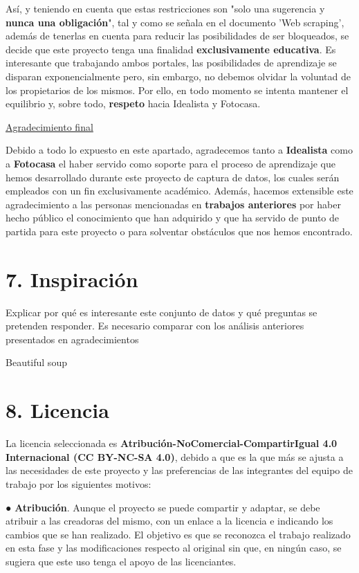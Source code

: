 \documentclass[12pt]{article}
\begin{document}
Así, y teniendo en cuenta que estas restricciones son "solo una sugerencia y \textbf{nunca una obligación}", tal y como se señala en el documento 'Web scraping', además de tenerlas en cuenta para reducir las posibilidades de ser bloqueados, se decide que este proyecto tenga una finalidad \textbf{exclusivamente educativa}. Es interesante que trabajando ambos portales, las posibilidades de aprendizaje se disparan exponencialmente pero, sin embargo, no debemos olvidar la voluntad de los propietarios de los mismos. Por ello, en todo momento se intenta mantener el equilibrio y, sobre todo, \textbf{respeto} hacia Idealista y Fotocasa. 

 \underline{Agradecimiento final}
 
Debido a todo lo expuesto en este apartado, agradecemos tanto a \textbf{Idealista} como a \textbf{Fotocasa} el haber servido como soporte para el proceso de aprendizaje que hemos desarrollado durante este proyecto de captura de datos, los cuales serán empleados con un fin exclusivamente académico. Además, hacemos extensible este agradecimiento a las personas mencionadas en \textbf{trabajos anteriores} por haber hecho público el conocimiento que han adquirido y que ha servido de punto de partida para este proyecto o para solventar obstáculos que nos hemos encontrado. 

\section*{7. Inspiración }\vspace{-1.5em}

Explicar por qué es interesante este conjunto de datos y qué
preguntas se pretenden responder. Es necesario comparar con los análisis
anteriores presentados en agradecimientos

Beautiful soup

\section*{8. Licencia }\vspace{-1.5em}

La licencia seleccionada es\textbf{ Atribución-NoComercial-CompartirIgual 4.0 Internacional (CC BY-NC-SA 4.0)}, debido a que es la que más se ajusta a las necesidades de este proyecto y las preferencias de las integrantes del equipo de trabajo por los siguientes motivos:

● \textbf{Atribución}. Aunque el proyecto se puede compartir y adaptar, se debe atribuir a las creadoras del mismo, con un enlace a la licencia e indicando los cambios que se han realizado. El objetivo es que se reconozca el trabajo realizado en esta fase y las modificaciones respecto al original sin que, en ningún caso, se sugiera que este uso tenga el apoyo de las licenciantes.  
\end{document}

